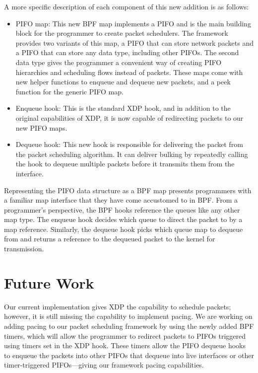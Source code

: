 \documentclass[sigconf, nonacm]{acmart}
\begin{document}
A more specific description of each component of this new addition is as follows:

\begin{itemize}
        \item PIFO map: This new BPF map implements a PIFO and is the main building block for the programmer to create packet schedulers. The framework provides two variants of this map, a PIFO that can store network packets and a PIFO that can store any data type, including other PIFOs. The second data type gives the programmer a convenient way of creating PIFO hierarchies and scheduling flows instead of packets. These maps come with new helper functions to enqueue and dequeue new packets, and a peek function for the generic PIFO map.
        \item Enqueue hook: This is the standard XDP hook, and in addition to the original capabilities of XDP, it is now capable of redirecting packets to our new PIFO maps.
        \item Dequeue hook: This new hook is responsible for delivering the packet from the packet scheduling algorithm. It can deliver bulking by repeatedly calling the hook to dequeue multiple packets before it transmits them from the interface.
\end{itemize}

Representing the PIFO data structure as a BPF map presents programmers with a familiar map interface that they have come accustomed to in BPF. From a programmer's perspective, the BPF hooks reference the queues like any other map type. The enqueue hook decides which queue to direct the packet to by a map reference. Similarly, the dequeue hook picks which queue map to dequeue from and returns a reference to the dequeued packet to the kernel for transmission.


\section{Future Work}

Our current implementation gives XDP the capability to schedule packets; however, it is still missing the capability to implement pacing. We are working on adding pacing to our packet scheduling framework by using the newly added BPF timers, which will allow the programmer to redirect packets to PIFOs triggered using timers set in the XDP hook. These timers allow the PIFO dequeue hooks to enqueue the packets into other PIFOs that dequeue into live interfaces or other timer-triggered PIFOs—giving our framework pacing capabilities.
\end{document}
